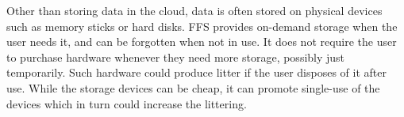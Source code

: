 Other than storing data in the cloud, data is often stored on physical devices such as memory sticks or hard disks. \gls{FFS} provides \mbox{on-demand} storage when the user needs it, and can be forgotten when not in use. It does not require the user to purchase hardware whenever they need more storage, possibly just temporarily. Such hardware could produce litter if the user disposes of it after use. While the storage devices can be cheap, it can promote \mbox{single-use} of the devices which in turn could increase the littering.

